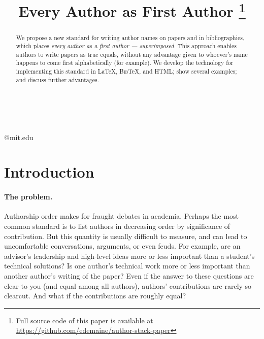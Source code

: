 \documentclass[natbib,authoryear]{sigtbd17-style}
\def\BibTeX{\textsc{Bib}\TeX}
\begin{document}
\title{Every Author as First Author%
  \thanks{Full source code of this paper is available at
    \url{https://github.com/edemaine/author-stack-paper}}}

%
%

{ \\
  \\
}
{@mit.edu}

\maketitle

\begin{abstract}
  We propose a new standard for writing author names on papers
  and in bibliographies, which places
  \emph{every author as a first author --- superimposed}.
  This approach enables authors to write papers as true equals,
  without any advantage given to whoever's name
  happens to come first alphabetically (for example).
  We develop the technology for implementing this standard
  in \LaTeX, \BibTeX, and HTML;
  show several examples; and discuss further advantages.
\end{abstract}

\section{Introduction}

\paragraph{The problem.}

Authorship order makes for fraught debates in academia.
Perhaps the most common standard is to list authors in decreasing order
by significance of contribution.
But this quantity is usually difficult to measure,
and can lead to uncomfortable conversations, arguments, or even feuds.
For example, are an advisor's leadership and high-level ideas
more or less important than a student's technical solutions?
Is one author's technical work more or less important than
another author's writing of the paper?
Even if the answer to these questions are clear to you
(and equal among all authors), authors' contributions are rarely so clearcut.
And what if the contributions are roughly equal?
\end{document}

